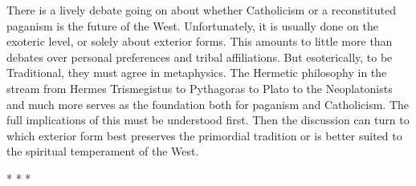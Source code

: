 There is a lively debate going on about whether Catholicism or a reconstituted paganism is the future of the West. Unfortunately, it is usually done on the exoteric level, or solely about exterior forms. This amounts to little more than debates over personal preferences and tribal affiliations. But esoterically, to be Traditional, they must agree in metaphysics. The Hermetic philosophy in the stream from Hermes Trismegistus to Pythagoras to Plato to the Neoplatonists and much more serves as the foundation both for paganism and Catholicism. The full implications of this must be understood first. Then the discussion can turn to which exterior form best preserves the primordial tradition or is better suited to the spiritual temperament of the West.



\begin{center}* * *\end{center}

